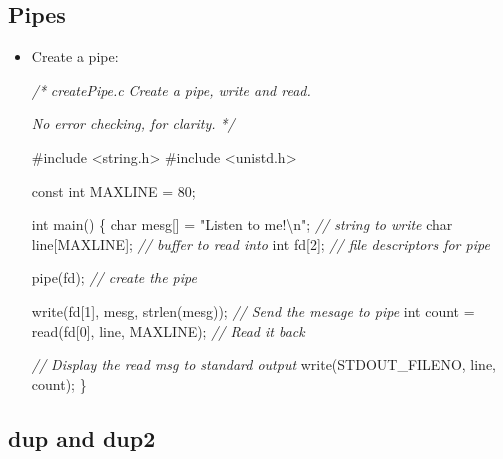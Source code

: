\documentclass[]{article}
\newenvironment{Shaded}{}{}
\newcommand{\DataTypeTok}[1]{\textcolor[rgb]{0.56,0.13,0.00}{#1}}
\newcommand{\DecValTok}[1]{\textcolor[rgb]{0.25,0.63,0.44}{#1}}
\newcommand{\SpecialCharTok}[1]{\textcolor[rgb]{0.25,0.44,0.63}{#1}}
\newcommand{\StringTok}[1]{\textcolor[rgb]{0.25,0.44,0.63}{#1}}
\newcommand{\ImportTok}[1]{#1}
\newcommand{\CommentTok}[1]{\textcolor[rgb]{0.38,0.63,0.69}{\textit{#1}}}
\newcommand{\PreprocessorTok}[1]{\textcolor[rgb]{0.74,0.48,0.00}{#1}}
\newcommand{\NormalTok}[1]{#1}
\begin{document}
\subsection{\texorpdfstring{\textbf{Pipes}}{Pipes}}\label{header-n420}

\begin{itemize}
\item
  Create a pipe:

\begin{Shaded}
\begin{Highlighting}[]
\CommentTok{/*}
\CommentTok{createPipe.c}
\CommentTok{Create a pipe, write and read.}

\CommentTok{No error checking, for clarity.}
\CommentTok{*/}

\PreprocessorTok{#include }\ImportTok{<string.h>}
\PreprocessorTok{#include }\ImportTok{<unistd.h>}

\DataTypeTok{const} \DataTypeTok{int}\NormalTok{ MAXLINE = }\DecValTok{80}\NormalTok{;}

\DataTypeTok{int}\NormalTok{ main() \{}
    \DataTypeTok{char}\NormalTok{ mesg[] = }\StringTok{"Listen to me!}\SpecialCharTok{\textbackslash{}n}\StringTok{"}\NormalTok{;	}\CommentTok{// string to write}
    \DataTypeTok{char}\NormalTok{ line[MAXLINE];					}\CommentTok{// buffer to read into}
    \DataTypeTok{int}\NormalTok{ fd[}\DecValTok{2}\NormalTok{];							}\CommentTok{// file descriptors for pipe}
    
\NormalTok{    pipe(fd);							}\CommentTok{// create the pipe}
    
\NormalTok{    write(fd[}\DecValTok{1}\NormalTok{], mesg, strlen(mesg));	}\CommentTok{// Send the mesage to pipe}
    \DataTypeTok{int}\NormalTok{ count = read(fd[}\DecValTok{0}\NormalTok{], line, MAXLINE);	}\CommentTok{// Read it back}
    
    \CommentTok{// Display the read msg to standard output}
\NormalTok{    write(STDOUT_FILENO, line, count);}
\NormalTok{\}}
\end{Highlighting}
\end{Shaded}
\end{itemize}

\subsection{\texorpdfstring{\textbf{dup and
dup2}}{dup and dup2}}\label{header-n426}
\end{document}
